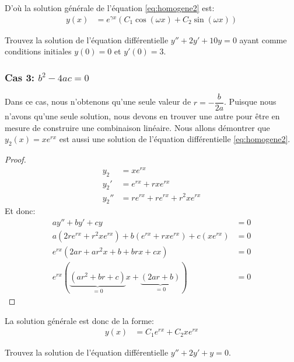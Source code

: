 \documentclass[]{book}
\theoremstyle{definition}
\theoremstyle{definition}
\theoremstyle{definition}
\theoremstyle{remark}
\let\BeginKnitrBlock\begin \let\EndKnitrBlock\end
\begin{document}
D'où la solution générale de l'équation \eqref{eq:homogene2} est:
\begin{align*}
y(x) &= e^{\gamma x}\left( C_1\cos(\omega x)+C_2\sin(\omega x) \right)
\end{align*}

\BeginKnitrBlock{example}
\protect\hypertarget{exm:unnamed-chunk-78}{}{\label{exm:unnamed-chunk-78}
}Trouvez la solution de l'équation différentielle \(y''+2y'+10y=0\)
ayant comme conditions initiales \(y(0)=0\) et \(y'(0)=3\).
\EndKnitrBlock{example}
\vspace*{10cm}

\hypertarget{cas-3-b2-4ac0}{%
\subsubsection{\texorpdfstring{Cas 3:
\(b^2-4ac=0\)}{Cas 3: b\^{}2-4ac=0}}\label{cas-3-b2-4ac0}}

Dans ce cas, nous n'obtenons qu'une seule valeur de
\(r=-\dfrac{b}{2a}\). Puisque nous n'avons qu'une seule solution, nous
devons en trouver une autre pour être en mesure de construire une
combinaison linéaire. Nous allons démontrer que \(y_2(x)=xe^{rx}\) est
aussi une solution de l'équation différentielle \eqref{eq:homogene2}.
\BeginKnitrBlock{proof}
{}\begin{align*}
y_2 &= xe^{rx} \\
y_2' &= e^{rx}+rxe^{rx} \\
y_2'' &= re^{rx}+re^{rx}+r^2xe^{rx}
\end{align*} Et donc: \begin{align*}
ay'' +by' +cy &= 0 \\
a(2re^{rx}+r^2xe^{rx})+b(e^{rx}+rxe^{rx})+c(xe^{rx}) &= 0 \\
e^{rx}(2ar+ar^2x+b+brx+cx) &= 0 \\
e^{rx}(\underbrace{(ar^2+br+c)}_{=0}x+\underbrace{(2ar+b)}_{=0}) &= 0 
\end{align*}
\EndKnitrBlock{proof}

La solution générale est donc de la forme: \begin{align*}
y(x) &= C_1e^{rx}+C_2xe^{rx}
\end{align*}

\BeginKnitrBlock{example}
\protect\hypertarget{exm:unnamed-chunk-80}{}{\label{exm:unnamed-chunk-80}
}Trouvez la solution de l'équation différentielle \(y''+2y'+y=0\).
\EndKnitrBlock{example}
\vspace*{5cm}
\end{document}
